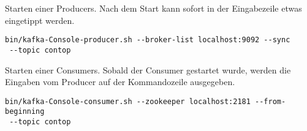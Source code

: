 Starten einer Producers. Nach dem Start kann sofort in der Eingabezeile etwas eingetippt werden.
\begin{verbatim}
bin/kafka-Console-producer.sh --broker-list localhost:9092 --sync 
 --topic contop
\end{verbatim}

Starten einer Consumers. Sobald der Consumer gestartet wurde, werden die Eingaben vom Producer auf der Kommandozeile ausgegeben.
\begin{verbatim}
bin/kafka-Console-consumer.sh --zookeeper localhost:2181 --from-beginning
 --topic contop 
\end{verbatim}